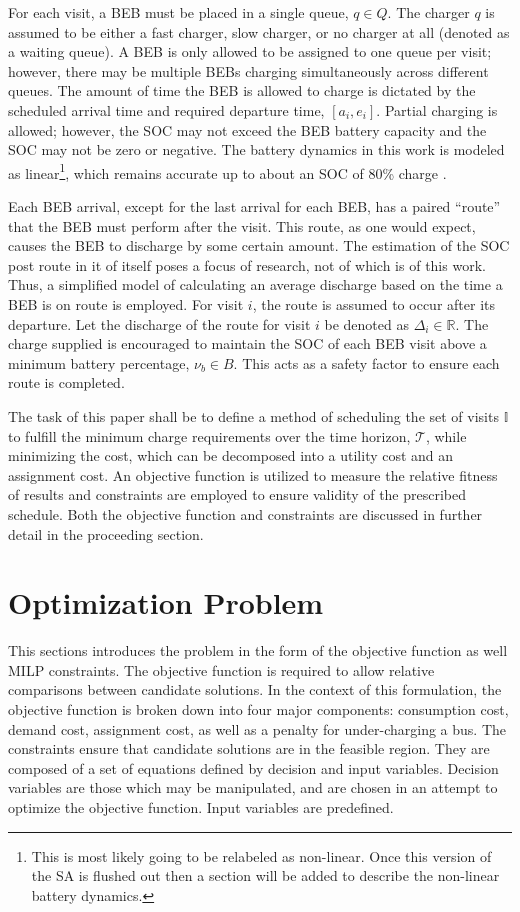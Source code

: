 \documentclass[11pt,a4paper,final]{article}
\newcommand{\T}{\mathcal{T}}                %
\newcommand{\I}{\mathbb{I}}                 %
\newcommand{\Qset}{Q}                       %
\begin{document}
For each visit, a BEB must be placed in a single queue, \(q \in \Qset\). The charger \(q\) is assumed to be either a fast
charger, slow charger, or no charger at all (denoted as a waiting queue). A BEB is only allowed to be assigned to one
queue per visit; however, there may be multiple BEBs charging simultaneously across different queues. The amount of time
the BEB is allowed to charge is dictated by the scheduled arrival time and required departure time, \([a_i, e_i]\).
Partial charging is allowed; however, the SOC may not exceed the BEB battery capacity and the SOC may not be zero or
negative. The battery dynamics in this work is modeled as linear\footnote{This is most likely going to be relabeled as non-linear. Once this version of the SA is flushed out then a
section will be added to describe the non-linear battery dynamics.}, which remains accurate up to about an SOC of 80\%
charge \cite{li-2016-batter-elect}.

Each BEB arrival, except for the last arrival for each BEB, has a paired ``route'' that the BEB must perform after the
visit. This route, as one would expect, causes the BEB to discharge by some certain amount. The estimation of the SOC
post route in it of itself poses a focus of research, not of which is of this work. Thus, a simplified model of
calculating an average discharge based on the time a BEB is on route is employed. For visit \(i\), the route is assumed to
occur after its departure. Let the discharge of the route for visit \(i\) be denoted as \(\Delta_i \in \mathbb{R}\). The charge supplied is
encouraged to maintain the SOC of each BEB visit above a minimum battery percentage, \(\nu_b \in B\). This acts as a safety
factor to ensure each route is completed.

The task of this paper shall be to define a method of scheduling the set of visits \(\I\) to fulfill the minimum charge
requirements over the time horizon, \(\T\), while minimizing the cost, which can be decomposed into a utility cost and an
assignment cost. An objective function is utilized to measure the relative fitness of results and constraints are
employed to ensure validity of the prescribed schedule. Both the objective function and constraints are discussed in
further detail in the proceeding section.
\section{Optimization Problem}
\label{sec:optimization-problem}
This sections introduces the problem in the form of the objective function as well MILP constraints. The objective
function is required to allow relative comparisons between candidate solutions. In the context of this formulation, the
objective function is broken down into four major components: consumption cost, demand cost, assignment cost, as well as
a penalty for under-charging a bus. The constraints ensure that candidate solutions are in the feasible region. They are
composed of a set of equations defined by decision and input variables. Decision variables are those which may be
manipulated, and are chosen in an attempt to optimize the objective function. Input variables are predefined.
\end{document}
